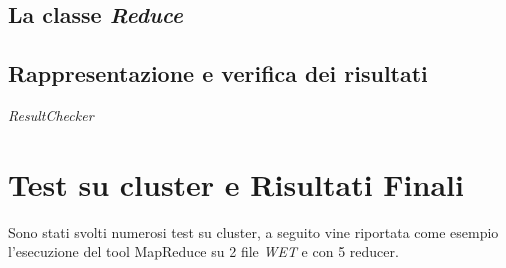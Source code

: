 \documentclass{article}
\newcommand{\MR}{MapReduce}
\newcommand{\WET}{\textit{WET}}
\newcommand{\filename}[1]{\textit{#1}}
\begin{document}
\subsection{La classe \textit{Reduce}}
\subsection{Rappresentazione e verifica dei risultati}
\filename{ResultChecker}

\newpage
\section{Test su cluster e Risultati Finali}

Sono stati svolti numerosi test su cluster, a seguito vine riportata come esempio l'esecuzione del tool \MR{} su 2 file \WET{} e con 5 reducer.  
\end{document}
